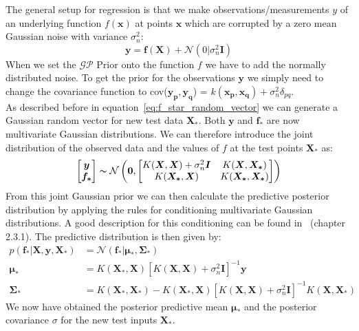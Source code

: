 \documentclass{article}
\begin{document}
The general setup for regression is that we make observations/measurements $y$ of an underlying function $f(\bm{x})$ at points $\bm{x}$ which are corrupted by a zero mean Gaussian noise with variance $\sigma_n^2$:
\begin{equation}
    \bm{y} = \bm{f}(\bm{X}) + \mathcal{N}(0|\sigma_n^2 \bm{I})
\end{equation}
When we set the $\mathcal{GP}$ Prior onto the function $f$ we have to add the normally distributed noise. To get the prior for the observations $\bm{y}$ we simply need to change the covariance function to cov($\bm{y_p,y_q}$) = $k(\bm{x_p,x_q}) + \sigma_n^2\delta_{pq}$.\\
As described before in equation~\ref{eq:f_star_random_vector} we can generate a Gaussian random vector for new test data $\bm{X_*}$. Both $\bm{y}$ and $\bm{f_*}$ are now multivariate Gaussian distributions. We can therefore introduce the joint distribution of the observed data and the values of $f$ at the test points $\bm{X_*}$ as:
\begin{equation}
    \label{eq:joint_f,X_*}
    \begin{aligned}
        \begin{bmatrix}
            \bm{y} \\
            \bm{f_*}
        \end{bmatrix}
        \thicksim  \mathcal{N}\left(\bm{0},
        \begin{bmatrix}
            K(\bm{X},\bm{X}) + \sigma_n^2 \bm{I} & K(\bm{X},\bm{X_*})   \\
            K(\bm{X_*},\bm{X})                   & K(\bm{X_*},\bm{X_*})
        \end{bmatrix}
        \right)
    \end{aligned}
\end{equation}
From this joint Gaussian prior we can then calculate the predictive posterior distribution by applying the rules for conditioning multivariate Gaussian distributions. A good description for this conditioning can be found in~\cite{bishop} (chapter 2.3.1). The predictive distribution is then given by:
\begin{equation}
    \begin{aligned}
        \label{eq:general_kernel}
        p(\bm{f_*}|\bm{X},\bm{y},\bm{X_*}) & = \mathcal{N}(\bm{f_*|\bm{\mu_*}},\bm{\Sigma_*})                                                           \\
        \bm{\mu_*}                         & =  K(\bm{X_*},\bm{X}){[K(\bm{X},\bm{X}) + \sigma_n^2 \bm{I}]}^{-1} \bm{y}                                  \\
        \bm{\Sigma_*}                      & = K(\bm{X_*},\bm{X_*}) - K(\bm{X_*},\bm{X}){[K(\bm{X},\bm{X}) + \sigma_n^2 \bm{I}]}^{-1}K(\bm{X},\bm{X_*})
    \end{aligned}
\end{equation}
We now have obtained the posterior predictive mean $\bm{\mu_*}$ and the posterior covariance $\sigma$ for the new test inputs $\bm{X_*}$.
\end{document}
